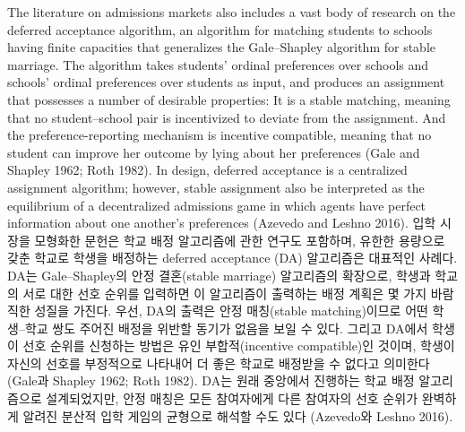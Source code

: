 \documentclass[11pt]{article} %
\theoremstyle{definition}
\theoremstyle{definition}
\begin{document}
\ifen
The literature on admissions markets also includes a vast body of research on the deferred acceptance algorithm, an algorithm for matching students to schools having finite capacities that generalizes the Gale--Shapley algorithm for stable marriage. The algorithm takes students' ordinal preferences over schools and schools' ordinal preferences over students as input, and produces an assignment that possesses a number of desirable properties: It is a stable matching, meaning that no student--school pair is incentivized to deviate from the assignment. And the preference-reporting mechanism is incentive compatible, meaning that no student can improve her outcome by lying about her preferences (Gale and Shapley 1962; Roth 1982). In design, deferred acceptance is a centralized assignment algorithm; however, stable assignment also be interpreted as the equilibrium of a decentralized admissions game in which agents have perfect information about one another's preferences (Azevedo and Leshno 2016).
\else
입학 시장을 모형화한 문헌은 학교 배정 알고리즘에 관한 연구도 포함하며, 유한한 용량으로 갖춘 학교로 학생을 배정하는 deferred acceptance (DA) 알고리즘은 대표적인 사례다. DA는 Gale--Shapley의 안정 결혼(stable marriage) 알고리즘의 확장으로, 학생과 학교의 서로 대한 선호 순위를 입력하면 이 알고리즘이 출력하는 배정 계획은 몇 가지 바람직한 성질을 가진다. 우선, DA의 출력은 안정 매칭(stable matching)이므로 어떤 학생--학교 쌍도 주어진 배정을 위반할 동기가 없음을 보일 수 있다. 그리고 DA에서 학생이 선호 순위를 신청하는 방법은 유인 부합적(incentive compatible)인 것이며, 학생이 자신의 선호를 부정적으로 나타내어 더 좋은 학교로 배정받을 수 없다고 의미한다 (Gale과 Shapley 1962; Roth 1982). DA는 원래 중앙에서 진행하는 학교 배정 알고리즘으로 설계되었지만, 안정 매칭은 모든 참여자에게 다른 참여자의 선호 순위가 완벽하게 알려진 분산적 입학 게임의 균형으로 해석할 수도 있다 (Azevedo와 Leshno 2016). 
\fi
\end{document}
